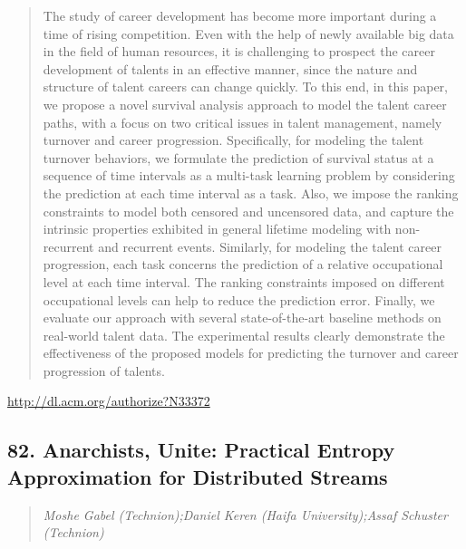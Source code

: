 \documentclass{article}
\begin{document}
\begin{quote}
The study of career development has become more important during a time of rising competition. Even with the help of newly available big data in the field of human resources, it is challenging to prospect the career development of talents in an effective manner, since the nature and structure of talent careers can change quickly. To this end, in this paper, we propose a novel survival analysis approach to model the talent career paths, with a focus on two critical issues in talent management, namely turnover and career progression. Specifically, for modeling the talent turnover behaviors, we formulate the prediction of survival status at a sequence of time intervals as a multi-task learning problem by considering the prediction at each time interval as a task. Also, we impose the ranking constraints to model both censored and uncensored data, and capture the intrinsic properties exhibited in general lifetime modeling with non-recurrent and recurrent events. Similarly, for modeling the talent career progression, each task concerns the prediction of a relative occupational level at each time interval. The ranking constraints imposed on different occupational levels can help to reduce the prediction error. Finally, we evaluate our approach with several state-of-the-art baseline methods on real-world talent data. The experimental results clearly demonstrate the effectiveness of the proposed models for predicting the turnover and career progression of talents.
\end{quote}

\href{http://dl.acm.org/authorize?N33372}{http://dl.acm.org/authorize?N33372}

\subsection{82. Anarchists, Unite: Practical Entropy Approximation for Distributed Streams}

\begin{quote}
\footnotesize{\textit{Moshe Gabel (Technion);Daniel Keren (Haifa University);Assaf Schuster (Technion)}}

\end{quote}
\end{document}
